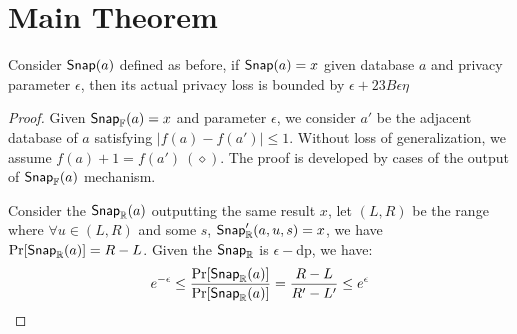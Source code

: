 \documentclass[a4paper,11pt]{article}
\begin{document}
\newpage
\section{Main Theorem}

\begin{thm}
Consider $\mathsf{Snap}(a)$ defined as before, if $\mathsf{Snap}(a) = x$ given database $a$ and privacy parameter $\epsilon$, then its actual privacy loss is bounded by $\epsilon + 23 B \epsilon \eta$
\end{thm}

\begin{proof}

Given $\mathsf{Snap}_{\mathbb{F}}(a) = x$ and parameter $\epsilon$, we consider $a'$ be the adjacent database of $a$ satisfying $|f(a) - f(a')| \leq 1$.
Without loss of generalization, we assume $f(a) + 1 = f(a') ~ (\diamond)$.
The proof is developed by cases of the output of $\mathsf{Snap}_{\mathbb{F}}(a)$ mechanism.
%

%
Consider the $\mathsf{Snap}_{\mathbb{R}}(a)$ outputting the same result $x$, let $(L, R)$ be the range where $\forall u \in (L, R)$ and some $s$, $\mathsf{Snap}_{\mathbb{R}}'(a, u, s) = x$, we have $\Pr[\mathsf{Snap}_{\mathbb{R}}(a)] = R - L$. Given the $\mathsf{Snap}_{\mathbb{R}}$ is $\epsilon-$dp, we have:
\[
	e^{-\epsilon} \leq \frac{\Pr[\mathsf{Snap}_{\mathbb{R}}(a)]}{\Pr[\mathsf{Snap}_{\mathbb{R}}(a)]} = \frac{R - L}{R' - L'} \leq e^{\epsilon}
\]
%


\end{proof}
\end{document}

